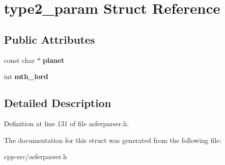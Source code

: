 \hypertarget{structtype2__param}{\section{type2\-\_\-param Struct Reference}
\label{structtype2__param}
}
\subsection*{Public Attributes}
\begin{DoxyCompactItemize}
\item 
\hypertarget{structtype2__param_a023b8795273b2184ea29a280531be012}{const char $\ast$ {\bfseries planet}}\label{structtype2__param_a023b8795273b2184ea29a280531be012}

\item 
\hypertarget{structtype2__param_a88c198571dc0ccd3b251bdbafd8bebe0}{int {\bfseries mth\-\_\-lord}}\label{structtype2__param_a88c198571dc0ccd3b251bdbafd8bebe0}

\end{DoxyCompactItemize}


\subsection{Detailed Description}


Definition at line 131 of file asferparser.\-h.



The documentation for this struct was generated from the following file\-:\begin{DoxyCompactItemize}
\item 
cpp-\/src/asferparser.\-h\end{DoxyCompactItemize}
